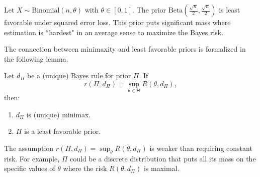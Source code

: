 \begin{ex}
    Let \(X \sim \text{Binomial}(n, \theta)\) with \(\theta \in [0, 1]\).
    The prior \(\text{Beta}\left(\frac{\sqrt{n}}{2}, \frac{\sqrt{n}}{2}\right)\) is least favorable under squared error loss. This prior puts significant mass where estimation is ``hardest" in an average sense to maximize the Bayes risk.
\end{ex}

The connection between minimaxity and least favorable priors is formalized in the following lemma.

\begin{lemma}
\label{lemma:least_favorable_condition}
Let \(d_{\Pi}\) be a (unique) Bayes rule for prior \(\Pi\). If
\[ r(\Pi, d_{\Pi}) = \sup_{\theta \in \Theta} R(\theta, d_{\Pi}), \]
then:
\begin{enumerate}
    \item \(d_{\Pi}\) is (unique) minimax.
    \item \(\Pi\) is a least favorable prior.
\end{enumerate}
\end{lemma}

\begin{note}
    The assumption \(r(\Pi, d_{\Pi}) = \sup_{\theta} R(\theta, d_{\Pi})\) is weaker than requiring constant risk. For example, \(\Pi\) could be a discrete distribution that puts all its mass on the specific values of \(\theta\) where the risk \(R(\theta, d_{\Pi})\) is maximal.
\end{note}

